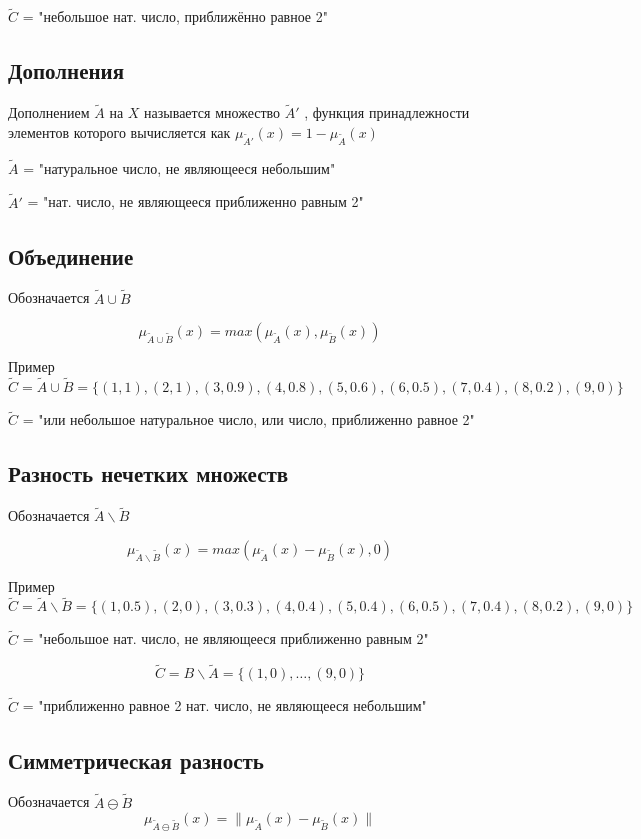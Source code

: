 				$\tilde C$ = "небольшое нат. число, приближённо равное 2"
			
		\subsection{Дополнения}
			Дополнением $\tilde A$ на $X$ называется множество $\tilde A'$ , функция принадлежности элементов 
			которого вычисляется как $\mu_{\tilde A'}(x) = 1 - \mu_{\tilde A}(x)$
		
			$\tilde A$ = "натуральное число, не являющееся небольшим"
			
			$\tilde A'$ = "нат. число, не являющееся приближенно равным 2"
		\subsection{Объединение}
		    	Обозначается $\tilde A \cup \tilde B$
		
			\[\mu_{\tilde A \cup \tilde B}(x) = max(\mu_{\tilde A}(x), \mu_{\tilde B}(x))\]
			
			Пример
			\[\tilde C = \tilde A \cup \tilde B = \{(1, 1), (2, 1), (3, 0.9), (4, 0.8), 
			(5, 0.6), (6, 0.5), (7, 0.4), (8, 0.2), (9, 0)\}\]
			
			$\tilde C$ = "или небольшое натуральное число, или число, приближенно равное 2"
				
		\subsection{Разность нечетких множеств}
		    	Обозначается $\tilde A \backslash \tilde B$
		
			\[\mu_{\tilde A \backslash \tilde B}(x) = max(\mu_{\tilde A}(x) -  \mu_{\tilde B}(x), 0)\]
			
			Пример
			\[\tilde C = \tilde A \backslash \tilde B = \{(1, 0.5), (2, 0), (3, 0.3), (4, 0.4), 
			(5, 0.4), (6, 0.5), (7, 0.4), (8, 0.2), (9, 0)\}\]
			
			$\tilde C$ = "небольшое нат. число, не являющееся приближенно равным 2"
			
			\[\tilde C = B \backslash \tilde A = \{(1, 0), \dots, (9, 0)\}\]
			
			$\tilde C$ = "приближенно равное 2 нат. число, не являющееся небольшим"
			
		\subsection{Симметрическая разность} 
			Обозначается $\tilde A \ominus \tilde B$
			\[\mu_{\tilde A \ominus \tilde B}(x) = \|\mu_{\tilde A}(x) - \mu_{\tilde B}(x)\|\]
			
